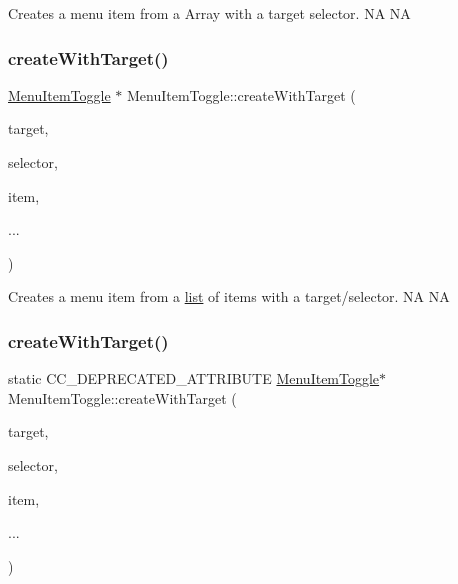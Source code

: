 Creates a menu item from a Array with a target selector.  NA  NA \mbox{\label{classMenuItemToggle_ad82bf7c116dd2f72741bf97ed7b2cb16}} 
\subsubsection{\texorpdfstring{create\+With\+Target()}{createWithTarget()}\hspace{0.1cm}{\footnotesize\ttfamily [3/4]}}
{\footnotesize\ttfamily \hyperlink{classMenuItemToggle}{Menu\+Item\+Toggle} $\ast$ Menu\+Item\+Toggle\+::create\+With\+Target (\begin{DoxyParamCaption}\item[{\hyperlink{classRef}{Ref} $\ast$}]{target,  }\item[{S\+E\+L\+\_\+\+Menu\+Handler}]{selector,  }\item[{\hyperlink{classMenuItem}{Menu\+Item} $\ast$}]{item,  }\item[{}]{... }\end{DoxyParamCaption})\hspace{0.3cm}{\ttfamily [static]}}

Creates a menu item from a \hyperlink{protocollist-p}{list} of items with a target/selector.  NA  NA \mbox{\label{classMenuItemToggle_ab02a4ece8d4da96c01c0164768a31d09}} 
\subsubsection{\texorpdfstring{create\+With\+Target()}{createWithTarget()}\hspace{0.1cm}{\footnotesize\ttfamily [4/4]}}
{\footnotesize\ttfamily static C\+C\+\_\+\+D\+E\+P\+R\+E\+C\+A\+T\+E\+D\+\_\+\+A\+T\+T\+R\+I\+B\+U\+TE \hyperlink{classMenuItemToggle}{Menu\+Item\+Toggle}$\ast$ Menu\+Item\+Toggle\+::create\+With\+Target (\begin{DoxyParamCaption}\item[{\hyperlink{classRef}{Ref} $\ast$}]{target,  }\item[{S\+E\+L\+\_\+\+Menu\+Handler}]{selector,  }\item[{\hyperlink{classMenuItem}{Menu\+Item} $\ast$}]{item,  }\item[{}]{... }\end{DoxyParamCaption})\hspace{0.3cm}{\ttfamily [static]}}

